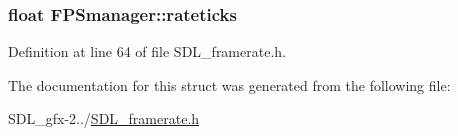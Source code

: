 \subsubsection[{rateticks}]{\setlength{\rightskip}{0pt plus 5cm}float F\+P\+Smanager\+::rateticks}\label{struct_f_p_smanager_a501cd3ffc7112afbbb95b5d9495ef7d3}


Definition at line 64 of file S\+D\+L\+\_\+framerate.\+h.



The documentation for this struct was generated from the following file\+:\begin{DoxyCompactItemize}
\item 
S\+D\+L\+\_\+gfx-\/2../\hyperlink{_s_d_l__framerate_8h}{S\+D\+L\+\_\+framerate.\+h}\end{DoxyCompactItemize}
